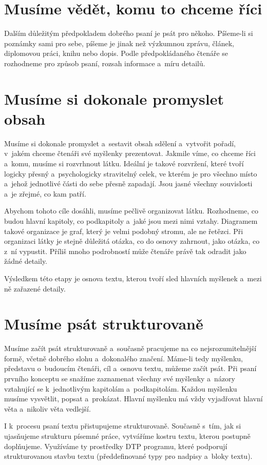 \section{Musíme vědět, komu to chceme říci}
Dalším důležitým předpokladem dobrého psaní je psát pro někoho. Píšeme-li si poznámky sami pro sebe, píšeme je jinak než výzkumnou zprávu, článek, diplomovou práci, knihu nebo dopis. Podle předpokládaného čtenáře se rozhodneme pro způsob psaní, rozsah informace a~míru detailů.

\section{Musíme si dokonale promyslet obsah}
Musíme si dokonale promyslet a~sestavit obsah sdělení a~vytvořit pořadí, v~jakém chceme čtenáři své myšlenky prezentovat. 
Jakmile víme, co chceme říci a~komu, musíme si rozvrhnout látku. Ideální je takové rozvržení, které tvoří logicky přesný a~psychologicky stravitelný celek, ve kterém je pro všechno místo a~jehož jednotlivé části do sebe přesně zapadají. Jsou jasné všechny souvislosti a~je zřejmé, co kam patří.

Abychom tohoto cíle dosáhli, musíme pečlivě organizovat látku. Rozhodneme, co budou hlavní kapitoly, co podkapitoly a~jaké jsou mezi nimi vztahy. Diagramem takové organizace je graf, který je velmi podobný stromu, ale ne řetězci. Při organizaci látky je stejně důležitá otázka, co do osnovy zahrnout, jako otázka, co z~ní vypustit. Příliš mnoho podrobností může čtenáře právě tak odradit jako žádné detaily.

Výsledkem této etapy je osnova textu, kterou tvoří sled hlavních myšlenek a~mezi ně zařazené detaily.

\section{Musíme psát strukturovaně} 
Musíme začít psát strukturovaně a~současně pracujeme na co nejsrozumitelnější formě, včetně dobrého slohu a~dokonalého značení. 
Máme-li tedy myšlenku, představu o~budoucím čtenáři, cíl a~osnovu textu, můžeme začít psát. Při psaní prvního konceptu se snažíme zaznamenat všechny své myšlenky a~názory vztahující se k~jednotlivým kapitolám a~podkapitolám. Každou myšlenku musíme vysvětlit, popsat a~prokázat. Hlavní myšlenku má vždy vyjadřovat hlavní věta a~nikoliv věta vedlejší.

I k~procesu psaní textu přistupujeme strukturovaně. Současně s~tím, jak si ujasňujeme strukturu písemné práce, vytváříme kostru textu, kterou postupně doplňujeme. Využíváme ty prostředky DTP programu, které podporují strukturovanou stavbu textu (předdefinované typy pro nadpisy a~bloky textu). 


